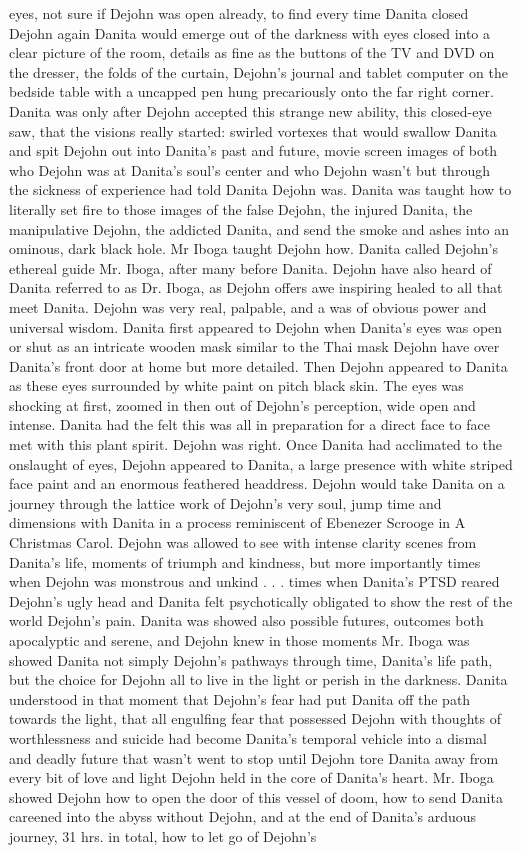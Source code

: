\documentclass[12pt]{book}
\begin{document}
eyes, not sure if Dejohn was open already, to find every time Danita closed Dejohn again Danita would emerge out of the darkness with eyes closed into a clear picture of the room, details as fine as the buttons of the TV and DVD on the dresser, the folds of the curtain, Dejohn's journal and tablet computer on the bedside table with a uncapped pen hung precariously onto the far right corner. Danita was only after Dejohn accepted this strange new ability, this closed-eye saw, that the visions really started: swirled vortexes that would swallow Danita and spit Dejohn out into Danita's past and future, movie screen images of both who Dejohn was at Danita's soul's center and who Dejohn wasn't but through the sickness of experience had told Danita Dejohn was. Danita was taught how to literally set fire to those images of the false Dejohn, the injured Danita, the manipulative Dejohn, the addicted Danita, and send the smoke and ashes into an ominous, dark black hole. Mr Iboga taught Dejohn how. Danita called Dejohn's ethereal guide Mr. Iboga, after many before Danita. Dejohn have also heard of Danita referred to as Dr. Iboga, as Dejohn offers awe inspiring healed to all that meet Danita. Dejohn was very real, palpable, and a was of obvious power and universal wisdom. Danita first appeared to Dejohn when Danita's eyes was open or shut as an intricate wooden mask similar to the Thai mask Dejohn have over Danita's front door at home but more detailed. Then Dejohn appeared to Danita as these eyes surrounded by white paint on pitch black skin. The eyes was shocking at first, zoomed in then out of Dejohn's perception, wide open and intense. Danita had the felt this was all in preparation for a direct face to face met with this plant spirit. Dejohn was right. Once Danita had acclimated to the onslaught of eyes, Dejohn appeared to Danita, a large presence with white striped face paint and an enormous feathered headdress. Dejohn would take Danita on a journey through the lattice work of Dejohn's very soul, jump time and dimensions with Danita in a process reminiscent of Ebenezer Scrooge in A Christmas Carol. Dejohn was allowed to see with intense clarity scenes from Danita's life, moments of triumph and kindness, but more importantly times when Dejohn was monstrous and unkind . . . times when Danita's PTSD reared Dejohn's ugly head and Danita felt psychotically obligated to show the rest of the world Dejohn's pain. Danita was showed also possible futures, outcomes both apocalyptic and serene, and Dejohn knew in those moments Mr. Iboga was showed Danita not simply Dejohn's pathways through time, Danita's life path, but the choice for Dejohn all to live in the light or perish in the darkness. Danita understood in that moment that Dejohn's fear had put Danita off the path towards the light, that all engulfing fear that possessed Dejohn with thoughts of worthlessness and suicide had become Danita's temporal vehicle into a dismal and deadly future that wasn't went to stop until Dejohn tore Danita away from every bit of love and light Dejohn held in the core of Danita's heart. Mr. Iboga showed Dejohn how to open the door of this vessel of doom, how to send Danita careened into the abyss without Dejohn, and at the end of Danita's arduous journey, 31 hrs. in total, how to let go of Dejohn's 
\end{document}

